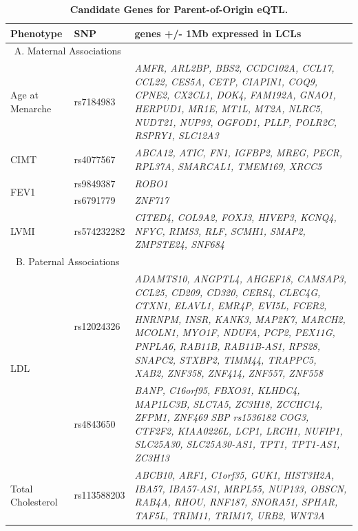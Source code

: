 \begin{table}
\centering
\begin{adjustbox}{width={\textwidth}}
\begin{tabular}{@{}p{5cm}|p{5cm}|p{10cm}@{}}
\toprule Phenotype & SNP & genes +/- 1Mb expressed in LCLs\\ \midrule

 \multicolumn{2}{c}{A. Maternal Associations} &\\ \hline
 
 Age at Menarche & rs7184983 & \emph{AMFR, ARL2BP, BBS2, CCDC102A, CCL17, CCL22, CES5A, CETP, CIAPIN1, COQ9, CPNE2, CX2CL1, DOK4, FAM192A, GNAO1, HERPUD1, MR1E, MT1L, MT2A, NLRC5, NUDT21, NUP93, OGFOD1, PLLP, POLR2C, RSPRY1, SLC12A3} \\ \hline
CIMT & rs4077567 & \emph{ABCA12, ATIC, FN1, IGFBP2, MREG, PECR, RPL37A, SMARCAL1, TMEM169, XRCC5} \\ \hline

\multirow{2}{5cm}{FEV1} & rs9849387 & \emph{ROBO1} \\ \cline{2-3}
 & rs6791779 & \emph{ZNF717} \\ \hline
LVMI	 & rs574232282 & \emph{CITED4, COL9A2, FOXJ3, HIVEP3, KCNQ4, NFYC, RIMS3, RLF, SCMH1, SMAP2, ZMPSTE24, SNF684} \\ \hline
\multicolumn{2}{c}{B. Paternal Associations} &\\  \hline
\multirow{2}{5cm}{LDL} & rs12024326 & \emph{ADAMTS10, ANGPTL4, AHGEF18, CAMSAP3, CCL25, CD209, CD320, CERS4, CLEC4G, CTXN1, ELAVL1, EMR4P, EVI5L, FCER2, HNRNPM, INSR, KANK3, MAP2K7, MARCH2, MCOLN1, MYO1F, NDUFA, PCP2, PEX11G, PNPLA6, RAB11B, RAB11B-AS1, RPS28, SNAPC2, STXBP2, TIMM44, TRAPPC5, XAB2, ZNF358, ZNF414, ZNF557, ZNF558} \\  \cline{2-3}

 & rs4843650 & \emph{BANP, C16orf95, FBXO31, KLHDC4, MAP1LC3B, SLC7A5, ZC3H18, ZCCHC14, ZFPM1, ZNF469
SBP	rs1536182	COG3, CTF2F2, KIAA0226L, LCP1, LRCH1, NUFIP1, SLC25A30, SLC25A30-AS1, TPT1, TPT1-AS1, ZC3H13}\\ \hline
Total Cholesterol & rs113588203 & \emph{ABCB10, ARF1, C1orf35, GUK1, HIST3H2A, IBA57, IBA57-AS1, MRPL55, NUP133, OBSCN, RAB4A, RHOU, RNF187, SNORA51, SPHAR, TAF5L, TRIM11, TRIM17, URB2, WNT3A} \\ \bottomrule
\end{tabular}
\end{adjustbox}
\caption[Candidate Genes for Parent-of-Origin eQTL. ]{\textbf{Candidate Genes for Parent-of-Origin eQTL.}}
\label{tab:tab-s3}
\end{table}




